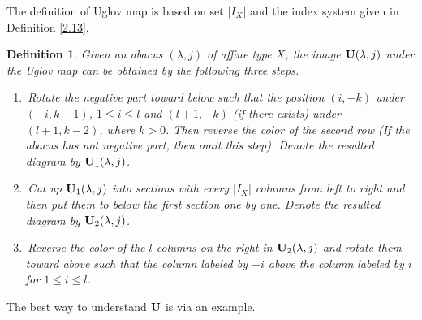 \documentclass[11pt]{amsart}
\theoremstyle{plain}
\numberwithin{equation}{subsection}
\newtheorem{definition}[theorem]{Definition}
\newcommand{\lam}{\lambda}
\begin{document}
The definition of Uglov map is based on set $|I_X|$ and the index system given in Definition \ref{2.13}.

\begin{definition}\label{2.15}
Given an abacus $(\lam, j)$ of affine type $X$, the image ${\rm\bf U}(\lam, j)$ under the Uglov map can be obtained by the following three steps.
\begin{enumerate}
\item [\rm(1)]\,Rotate the negative part toward below such that the position $(i, -k)$ under $(-i, k-1)$, $1\leq i\leq l$ 
and $(l+1, -k)$ (if there exists) under $(l+1, k-2)$, where $k>0$. Then reverse the color of the second row (If the abacus has not negative part, then omit this step).
Denote the resulted diagram by ${\rm\bf U}_1(\lam, j)$.
\item [\rm(2)]\,Cut up ${\rm\bf U}_1(\lam, j)$ into sections with every $|I_X|$ columns 
from left to right 
and then put them to below the first section one by one.
Denote the resulted diagram by ${\rm\bf U}_2(\lam, j)$.
\item [\rm(3)]\,Reverse the color of the $l$ columns on the right in ${\rm\bf U}_2(\lam, j)$ and rotate them toward above such that 
the column labeled by $-i$ above the column labeled by $i$ for $1\leq i\leq l$.
\end{enumerate}
\end{definition}

The best way to understand $\rm\bf U$ is via an example.
\end{document}
